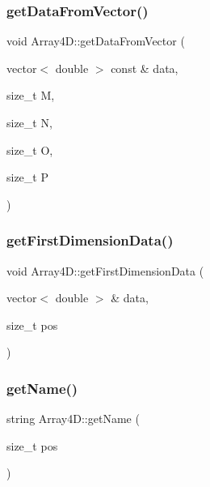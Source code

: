 \subsubsection{\texorpdfstring{get\+Data\+From\+Vector()}{getDataFromVector()}}
{\footnotesize\ttfamily void Array4\+D\+::get\+Data\+From\+Vector (\begin{DoxyParamCaption}\item[{vector$<$ double $>$ const \&}]{data,  }\item[{size\+\_\+t}]{M,  }\item[{size\+\_\+t}]{N,  }\item[{size\+\_\+t}]{O,  }\item[{size\+\_\+t}]{P }\end{DoxyParamCaption})}

\mbox{\label{class_array4_d_a3f8123825b362550f792aa6d0a114304}} 
\subsubsection{\texorpdfstring{get\+First\+Dimension\+Data()}{getFirstDimensionData()}}
{\footnotesize\ttfamily void Array4\+D\+::get\+First\+Dimension\+Data (\begin{DoxyParamCaption}\item[{vector$<$ double $>$ \&}]{data,  }\item[{size\+\_\+t}]{pos }\end{DoxyParamCaption})}

\mbox{\label{class_array4_d_a0cd461b4f7d2b9c58112342ce7160d71}} 
\subsubsection{\texorpdfstring{get\+Name()}{getName()}}
{\footnotesize\ttfamily string Array4\+D\+::get\+Name (\begin{DoxyParamCaption}\item[{size\+\_\+t}]{pos }\end{DoxyParamCaption})}

\mbox{\label{class_array4_d_afc2d361e388a5faba62caef697033911}} 
